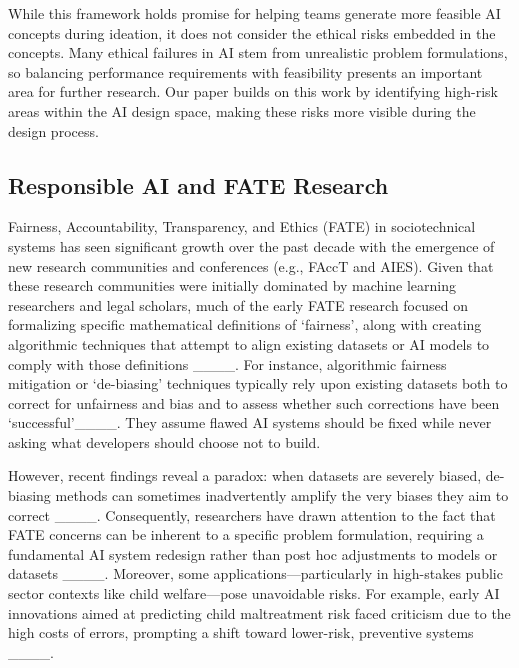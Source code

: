 While this framework holds promise for helping teams generate more feasible AI concepts during ideation, it does not consider the ethical risks embedded in the concepts. Many ethical failures in AI stem from unrealistic problem formulations, so balancing performance requirements with feasibility presents an important area for further research. Our paper builds on this work by identifying high-risk areas within the AI design space, making these risks more visible during the design process.


\subsection{Responsible AI and FATE Research}\label{subsec:RAI_FATE}

Fairness, Accountability, Transparency, and Ethics (FATE) in sociotechnical systems has seen significant growth over the past decade with the emergence of new research communities and conferences (e.g., FAccT and AIES). Given that these research communities were initially dominated by machine learning researchers and legal scholars, much of the early FATE research focused on formalizing specific mathematical definitions of `fairness', along with creating algorithmic techniques that attempt to align existing datasets or AI models to comply with those definitions ____. For instance, algorithmic fairness mitigation or `de-biasing' techniques typically rely upon existing datasets both to correct for unfairness and bias and to assess whether such corrections have been `successful'____. They assume flawed AI systems should be fixed while never asking what developers should choose not to build.

However, recent findings reveal a paradox: when datasets are severely biased, de-biasing methods can sometimes inadvertently amplify the very biases they aim to correct ____. Consequently, researchers have drawn attention to the fact that FATE concerns can be inherent to a specific problem formulation, requiring a fundamental AI system redesign rather than post hoc adjustments to models or datasets ____. Moreover, some applications—particularly in high-stakes public sector contexts like child welfare—pose unavoidable risks. For example, early AI innovations aimed at predicting child maltreatment risk faced criticism due to the high costs of errors, prompting a shift toward lower-risk, preventive systems ____. 


